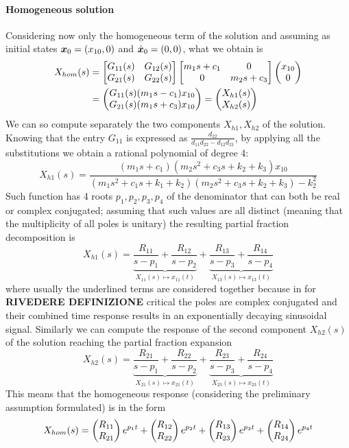 	\paragraph{Homogeneous solution} Considering now only the homogeneous term of the solution and assuming as initial states $\vett x_0 = (x_{10},0)$ and $\dvett x_0 =(0,0)$, what we obtain is
	\begin{align*}
		X_{hom}(s) & = \matrix{ G_{11}(s) & G_{12}(s) \\ G_{21}(s) & G_{22}(s) }  \matrix{ m_1 s + c_1 & 0 \\ 0 & m_2 s + c_3 } \vec{x_{10} \\ 0} \\ & = \vec{G_{11}(s) (m_1 s- c_1) x_{10} \\ G_{21}(s) (m_1s + c_3) x_{10} } = \vec{X_{h1}(s) \\ X_{h2}(s) }
	\end{align*}
	We can so compute separately the two components $X_{h1},X_{h2}$ of the solution. Knowing that the entry $G_{11}$ is expressed as $\frac{d_{22}}{d_{11}d_{22} - d_{12}d_{21}}$, by applying all the substitutions we obtain a rational polynomial of degree 4:
	\[ X_{h1}(s) = \frac{(m_1s + c_1) (m_2 s^2 + c_3 s + k_2 + k_3) x_{10}}{ (m_1 s^2 + c_1 s + k_1 + k_2)(m_2s^2 + c_3s + k_2+k_3) - k_2^2 } \]
	Such function has 4 roots $p_1,p_2,p_3,p_4$ of the denominator that can both be real or complex conjugated; assuming that such values are all distinct (meaning that the multiplicity of all poles is unitary) the resulting partial fraction decomposition is
	\[ X_{h1}(s) = \underbrace{\frac{R_{11}}{s-p_1} + \frac{R_{12}}{s-p_2}}_{X_{11}(s) \mapsto x_{11}(t) } + \underbrace{\frac{R_{13}}{s-p_3} + \frac{R_{14}}{s-p_4}}_{X_{13}(s)\mapsto x_{13}(t)} \]
	where usually the underlined terms are considered together because in for \textbf{RIVEDERE DEFINIZIONE} critical the poles are complex conjugated and their combined time response results in an exponentially decaying sinusoidal signal. Similarly we can compute the response of the second component $X_{h2}(s)$ of the solution reaching the partial fraction expansion
	\[ X_{h2}(s) = \underbrace{\frac{R_{21}}{s-p_1} + \frac{R_{22}}{s-p_2}}_{X_{21}(s) \mapsto x_{21}(t) } + \underbrace{\frac{R_{23}}{s-p_3} + \frac{R_{24}}{s-p_4}}_{X_{23}(s)\mapsto x_{23}(t)} \]
	This means that the homogeneous response (considering the preliminary assumption formulated) is in the form
	\[ X_{hom}(s) = \vec{R_{11} \\ R_{21} } e^{p_1 t} + \vec{R_{12} \\ R_{22} } e^{p_2 t} + \vec{R_{13} \\ R_{23} } e^{p_3 t} + \vec{R_{14} \\ R_{24} } e^{p_4 t} \]
